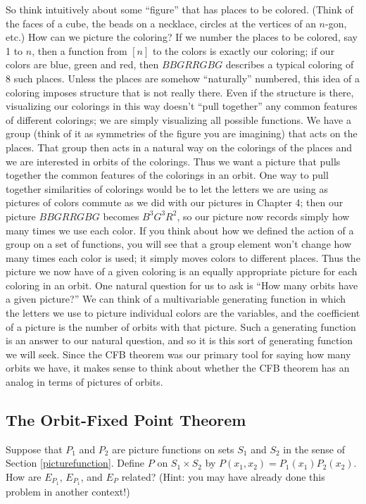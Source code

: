 So think intuitively about some ``figure'' that has places to be colored. 
(Think of the faces of a cube, the beads on a necklace, circles at the
vertices
of an $n$-gon, etc.)  How can we picture the coloring?  If we number the places
to be colored, say 1 to $n$, then a function from $[n]$ to the colors is
exactly
our coloring; if our colors are blue, green and red,  then $BBGRRGBG$ describes
a
typical coloring of 8 such places.  Unless the places are somehow ``naturally''
numbered, this idea of a coloring imposes structure that is not really there. 
Even if the structure is there, visualizing  our colorings in this way doesn't
``pull together'' any common features of different colorings; we are simply
visualizing all possible functions. We have a group (think of it as symmetries
of
the figure you are imagining) that acts on the places.  That group then acts in
a
natural way on the colorings of the places and we are interested in orbits of
the
colorings.  Thus we want a picture that pulls together the common features of
the
colorings in an orbit.   One way to pull together similarities of colorings
would
be to let the letters we are using as pictures of colors commute as we did with
our pictures in Chapter 4; then our picture
$BBGRRGBG$ becomes $B^3G^3R^2$, so our picture now records simply how many
times
we use each color. If you think about how we defined the action of a group on a
set of functions, you will see that a group element won't change how many times
each color is used;
it simply moves colors to different places.  Thus the picture we now have of a
given coloring is an equally appropriate picture for each coloring in an orbit. 
One natural question for us to ask is ``How many orbits have a given picture?'' 
We can think of a multivariable generating function in which the letters we use
to picture individual colors are the variables, and the coefficient of a
picture
is the number of orbits with that picture.  Such a generating function is an
answer to our natural question, and so it is this sort of generating function
we
will seek.  Since the CFB theorem was our primary tool for saying how many
orbits
we have, it makes sense to think about whether the CFB theorem has an analog in
terms of pictures of orbits.

\subsection{The Orbit-Fixed Point Theorem}

\bp


\iteme   Suppose that $P_1$ and $P_2$ are picture functions on sets $S_1$ and
$S_2$ in the sense of Section \ref{picturefunction}. Define $P$ on $S_1 \times
S_2$ by
$P(x_1,x_2) = P_1(x_1)P_2(x_2)$.  How are
$E_{P_1}$, $E_{P_1}$, and $E_{P}$ related?  (Hint: you may have already done this
problem in another context!)\label{ProdPrincPictureEnumerators}

